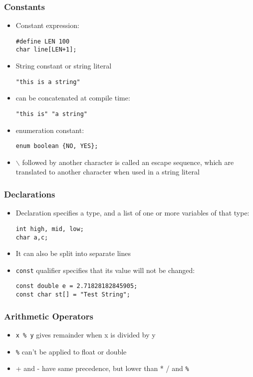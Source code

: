\documentclass[11pt]{beamer}
\begin{document}
\begin{frame}[fragile]\frametitle{Constants}
\label{sec-1-12}

\begin{itemize}
\item Constant expression:

\begin{verbatim}
#define LEN 100
char line[LEN+1];
\end{verbatim}
\item String constant or string literal

\begin{verbatim}
"this is a string"
\end{verbatim}
\item can be concatenated at compile time:

\begin{verbatim}
"this is" "a string"
\end{verbatim}
\item enumeration constant: 

\begin{verbatim}
enum boolean {NO, YES};
\end{verbatim}
\item $\backslash$ followed by another character is called an escape sequence, 
  which are translated to another character when used in a string literal
\end{itemize}
\end{frame}
\begin{frame}[fragile]\frametitle{Declarations}
\label{sec-1-13}

\begin{itemize}
\item Declaration specifies a type, and a list of one or more variables of that type:

\begin{verbatim}
int high, mid, low;
char a,c;
\end{verbatim}
\item It can also be split into separate lines
\item \verb~const~ qualifier specifies that its value will not be changed:

\begin{verbatim}
const double e = 2.71828182845905;
const char st[] = "Test String";
\end{verbatim}
\end{itemize}
\end{frame}
\begin{frame}[fragile]\frametitle{Arithmetic Operators}
\label{sec-1-14}

\begin{itemize}
\item \verb~x % y~ gives remainder when x is divided by y
\item \verb~%~ can't be applied to float or double
\item + and - have same precedence, but lower than * / and \verb~%~
\end{itemize}
\end{frame}
\end{document}
